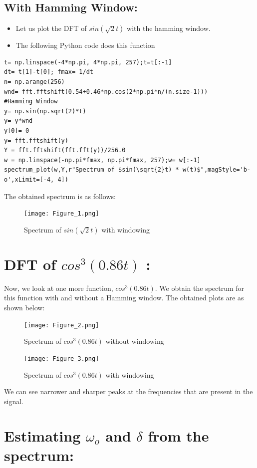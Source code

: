 \documentclass[11pt, a4paper]{article}
\begin{document}
\subsection{With Hamming Window:}
\begin{itemize}
    \item Let us plot the DFT of $sin(\sqrt{2}t)$ with the hamming window.
    \item The following Python code does this function
\end{itemize}
    \lstset{language=Python}
    \lstset{basicstyle=\footnotesize}
    \begin{lstlisting}
t= np.linspace(-4*np.pi, 4*np.pi, 257);t=t[:-1]     
dt= t[1]-t[0]; fmax= 1/dt
n= np.arange(256)
wnd= fft.fftshift(0.54+0.46*np.cos(2*np.pi*n/(n.size-1)))       #Hamming Window
y= np.sin(np.sqrt(2)*t)
y= y*wnd
y[0]= 0
y= fft.fftshift(y)
Y = fft.fftshift(fft.fft(y))/256.0
w = np.linspace(-np.pi*fmax, np.pi*fmax, 257);w= w[:-1]
spectrum_plot(w,Y,r"Spectrum of $sin(\sqrt{2}t) * w(t)$",magStyle='b-o',xLimit=[-4, 4])
    \end{lstlisting}
     The obtained spectrum is as follows:
            \begin{figure}[H]
            \centering
            \texttt{[image: Figure\_1.png]}
            \caption{Spectrum of $sin(\sqrt{2}t)$ with windowing}
            \label{fig:Fig2}
        \end{figure}   
\section{DFT of $cos^3(0.86 t)$ :}
Now, we look at one more function, $cos^3(0.86 t)$. We obtain the spectrum for this function with and without a Hamming window.\newline
The obtained plots are as shown below:
            \begin{figure}[H]
            \centering
            \texttt{[image: Figure\_2.png]}
            \caption{Spectrum of $cos^3(0.86 t)$  without windowing}
            \label{fig:Fig3}
        \end{figure}
            \begin{figure}[H]
            \centering
            \texttt{[image: Figure\_3.png]}
            \caption{Spectrum of $cos^3(0.86 t)$  with windowing}
            \label{fig:Fig4}
        \end{figure}
         We can see narrower and sharper peaks at the frequencies that are present in the signal.
\section{Estimating $\omega_o$ and $\delta$ from the spectrum:}
\end{document}
